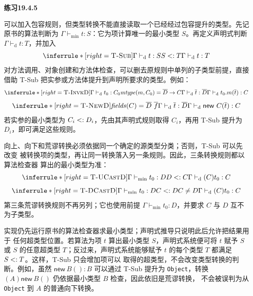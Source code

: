 \begin{taplsolutionentrybox}
\label{sol:translator:19.4.5}
\textbf{练习19.4.5}

可以加入包容规则，但类型转换不能直接读取一个已经经过包容提升的类型。先记
原书的算法判断为 \(\Gamma\vdash_{\min}t:S\)：它为项计算唯一的最小类型
\(S\)。再定义声明式判断 \(\Gamma\vdash_{\mathrm d}t:T\)，并加入
\[
\inferrule*[right=\textsc{T-Sub}]
 {\Gamma\vdash_{\mathrm d}t:S\\S\subtype T}
 {\Gamma\vdash_{\mathrm d}t:T}
\]
对方法调用、对象创建和方法体检查，可以删去原规则中单列的子类型前提，直接
借助 T-Sub 把实参或方法体提升到声明所要求的类型。例如：
\[
\inferrule*[right=\textsc{T-InvkD}]
 {\Gamma\vdash_{\mathrm d}t_0:C_0\\
  \mathit{mtype}(m,C_0)=\overline D\to C\\
  \Gamma\vdash_{\mathrm d}\overline t:\overline D}
 {\Gamma\vdash_{\mathrm d}t_0.m(\overline t):C}
\]
\[
\inferrule*[right=\textsc{T-NewD}]
 {\mathit{fields}(C)=\overline D\ \overline f\\
  \Gamma\vdash_{\mathrm d}\overline t:\overline D}
 {\Gamma\vdash_{\mathrm d}\mathsf{new}\ C(\overline t):C}
\]
若实参的最小类型为 \(C_i\mathrel{<:} D_i\)，先由其声明式规则取得 \(C_i\)，再用
T-Sub 提升为 \(D_i\)，即可满足这些规则。

向上、向下和荒谬转换必须依据同一个确定的源类型分类；否则，T-Sub 可以先改变
被转换项的类型，再让同一转换落入另一条规则。因此，三条转换规则都以算法检查器
算出的最小类型为准：
\[
\inferrule*[right=\textsc{T-UCastD}]
 {\Gamma\vdash_{\min}t_0:D\\D\subtype C}
 {\Gamma\vdash_{\mathrm d}(C)t_0:C}
\]
\[
\inferrule*[right=\textsc{T-DCastD}]
 {\Gamma\vdash_{\min}t_0:D\\C\subtype D\\C\ne D}
 {\Gamma\vdash_{\mathrm d}(C)t_0:C}
\]
第三条荒谬转换规则不再另列；它也使用前提
\(\Gamma\vdash_{\min}t_0:D\)，并要求 \(C\) 与 \(D\) 互不为子类型。

实现仍先运行原书的算法检查器求最小类型；声明式推导只说明此后允许把结果用于
任何超类型位置。若算法为项 \(t\) 算出最小类型 \(S\)，声明式系统便可将
\(t\) 赋予 \(S\) 或 \(S\) 的任意超类型 \(T\)；反过来，声明式系统能够赋予
\(t\) 的每个类型 \(T\) 都满足 \(S\mathrel{<:} T\)。这样，T-Sub 只会增加项可以
取得的超类型，不会改变类型转换的判断。例如，虽然
\(\mathsf{new}\ B():B\) 可以通过 T-Sub 提升为 \texttt{Object}，转换
\((A)\mathsf{new}\ B()\) 仍依据最小类型 \(B\) 检查，因此依旧是荒谬转换，
不会被误判为从 \texttt{Object} 到 \(A\) 的普通向下转换。

\end{taplsolutionentrybox}

